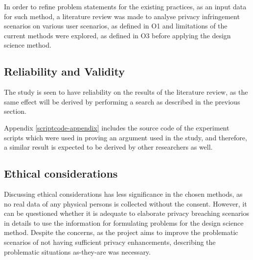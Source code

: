 In order to refine problem statements for the existing practices, as an input data for such method, a literature review was made to analyse privacy infringement scenarios on various user scenarios, as defined in O1 and limitations of the current methods were explored, as defined in O3 before applying the design science method.


\subsection{Reliability and Validity}
The study is seen to have reliability on the results of the literature review, as the same effect will be derived by performing a search as described in the previous section.

Appendix \ref{scriptcode-appendix} includes the source code of the experiment scripts which were used in proving an argument used in the study, and therefore, a similar result is expected to be derived by other researchers as well.

\subsection{Ethical considerations}
Discussing ethical considerations has less significance in the chosen methods, as no real data of any physical persons is collected without the consent.
However, it can be questioned whether it is adequate to elaborate privacy breaching scenarios in details to use the information for formulating problems for the design science method.
Despite the concerns, as the project aims to improve the problematic scenarios of not having sufficient privacy enhancements, describing the problematic situations as-they-are was necessary.
